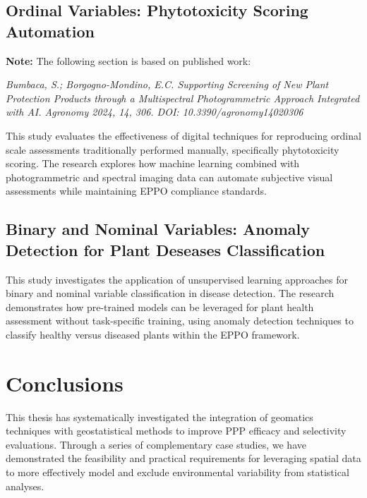 \documentclass[12pt,a4paper,oneside]{report}
\begin{document}
\section{Ordinal Variables: Phytotoxicity Scoring Automation}

\textbf{Note:} The following section is based on published work:

\textit{Bumbaca, S.; Borgogno-Mondino, E.C. Supporting Screening of New Plant Protection Products through a Multispectral Photogrammetric Approach Integrated with AI. Agronomy 2024, 14, 306. DOI: 10.3390/agronomy14020306}

This study evaluates the effectiveness of digital techniques for reproducing ordinal scale assessments traditionally performed manually, specifically phytotoxicity scoring. The research explores how machine learning combined with photogrammetric and spectral imaging data can automate subjective visual assessments while maintaining EPPO compliance standards.





\section{Binary and Nominal Variables: Anomaly Detection for Plant Deseases Classification}

This study investigates the application of unsupervised learning approaches for binary and nominal variable classification in disease detection. The research demonstrates how pre-trained models can be leveraged for plant health assessment without task-specific training, using anomaly detection techniques to classify healthy versus diseased plants within the EPPO framework.






\chapter{Conclusions}

This thesis has systematically investigated the integration of geomatics techniques 
with geostatistical methods to improve PPP efficacy and selectivity evaluations. 
Through a series of complementary case studies, we have demonstrated the feasibility 
and practical requirements for leveraging spatial data to more effectively model 
and exclude environmental variability from statistical analyses.
\end{document}
